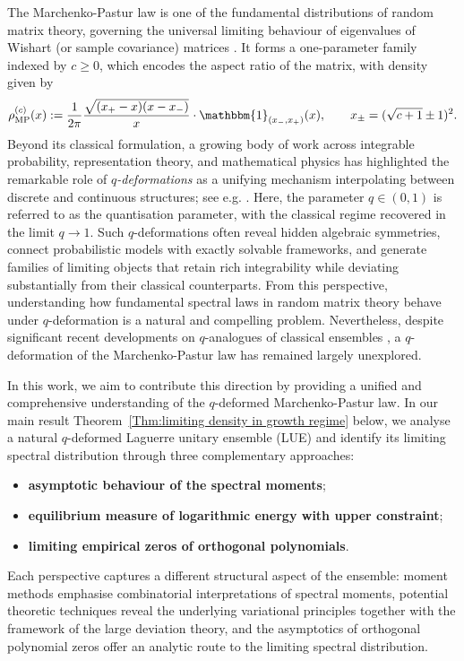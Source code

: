 \documentclass{amsart}
\theoremstyle{plain}
\theoremstyle{remark}
\numberwithin{equation}{section}
\begin{document}
The Marchenko-Pastur law is one of the fundamental distributions of random matrix theory, governing the universal limiting behaviour of eigenvalues of Wishart (or sample covariance) matrices \cite{MP67}. It forms a one-parameter family indexed by $c \ge 0$, which encodes the aspect ratio of the matrix, with density given by
\begin{equation} \label{def of MP law}
\rho _{\mathrm {MP}}^{(c)}(x) := \frac{1}{2\pi} \frac{ \sqrt{ (x_+-x)(x-x_-) } }{ x } \cdot \mathbbm{1}_{ (x_-,x_+) }(x), \qquad x_\pm = ( \sqrt{c+1} \pm 1 )^2. 
\end{equation}
Beyond its classical formulation, a growing body of work across integrable probability, representation theory, and mathematical physics has highlighted the remarkable role of \emph{$q$-deformations} as a unifying mechanism interpolating between discrete and continuous structures; see e.g. \cite{Jo01,BGG17,Ol21}. Here, the parameter $q \in (0,1)$ is referred to as the quantisation parameter, with the classical regime recovered in the limit $q \to 1$. Such $q$-deformations often reveal hidden algebraic symmetries, connect probabilistic models with exactly solvable frameworks, and generate families of limiting objects that retain rich integrability while deviating substantially from their classical counterparts. From this perspective, understanding how fundamental spectral laws in random matrix theory behave under $q$-deformation is a natural and compelling problem. Nevertheless, despite significant recent developments on $q$-analogues of classical ensembles 
\cite{BF25a,FLSY23,Fo21,MPS20,BFO24,BJO25,HMO25,BO24,LSYF25,CM25,LWYZ25,FL20}, a $q$-deformation of the Marchenko-Pastur law has remained largely unexplored.

In this work, we aim to contribute this direction by providing a unified and comprehensive understanding of the $q$-deformed Marchenko-Pastur law. In our main result Theorem~\ref{Thm:limiting density in growth regime} below, we analyse a natural $q$-deformed Laguerre unitary ensemble (LUE) and identify its limiting spectral distribution through three complementary approaches: 
\begin{itemize}
    \item[(A)] \textbf{asymptotic behaviour of the spectral moments};
    \smallskip 
    \item[(B)] \textbf{equilibrium measure of logarithmic energy with upper  constraint};  
    \smallskip 
    \item[(C)] \textbf{limiting empirical zeros of orthogonal polynomials}. 
\end{itemize}  
Each perspective captures a different structural aspect of the ensemble: moment methods emphasise combinatorial interpretations of spectral moments, potential theoretic techniques reveal the underlying variational principles together with the framework of the large deviation theory, and the asymptotics of orthogonal polynomial zeros offer an analytic route to the limiting spectral distribution. 
\end{document}
